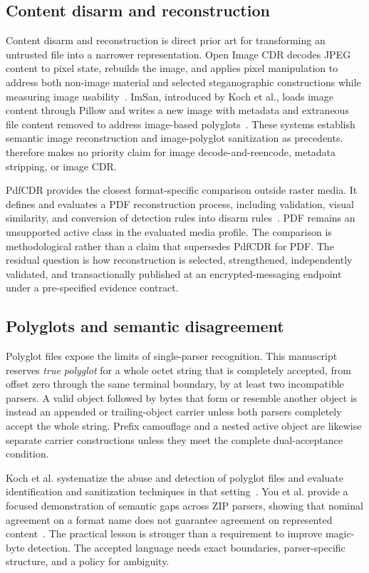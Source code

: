\subsection{Content disarm and reconstruction}

Content disarm and reconstruction is direct prior art for transforming an
untrusted file into a narrower representation. Open Image CDR decodes JPEG
content to pixel state, rebuilds the image, and applies pixel manipulation to
address both non-image material and selected steganographic constructions while
measuring image usability~\cite{belkind2023}. ImSan, introduced by Koch et al.,
loads image content through Pillow and writes a new image with metadata and
extraneous file content removed to address image-based polyglots~\cite{koch2025}.
These systems establish semantic image reconstruction and image-polyglot
sanitization as precedents. \AFD{} therefore makes no priority claim for image
decode-and-reencode, metadata stripping, or image CDR.

PdfCDR provides the closest format-specific comparison outside raster media. It
defines and evaluates a PDF reconstruction process, including validation,
visual similarity, and conversion of detection rules into disarm
rules~\cite{dubin2023}. PDF remains an unsupported active class in the evaluated
\AFD{} media profile. The comparison is methodological rather than a claim that
\AFD{} supersedes PdfCDR for PDF. The residual question is how reconstruction
is selected, strengthened, independently validated, and transactionally
published at an encrypted-messaging endpoint under a pre-specified evidence
contract.

\subsection{Polyglots and semantic disagreement}

Polyglot files expose the limits of single-parser recognition. This manuscript
reserves \emph{true polyglot} for a whole octet string that is completely
accepted, from offset zero through the same terminal boundary, by at least two
incompatible parsers. A valid object followed by bytes that form or resemble
another object is instead an appended or trailing-object carrier unless both
parsers completely accept the whole string. Prefix camouflage and a nested
active object are likewise separate carrier constructions unless they meet the
complete dual-acceptance condition.

Koch et al. systematize the abuse and detection of polyglot files and evaluate
identification and sanitization techniques in that setting~\cite{koch2025}.
You et al. provide a focused demonstration of semantic gaps across ZIP parsers,
showing that nominal agreement on a format name does not guarantee agreement on
represented content~\cite{you2025}. The practical lesson is stronger than a
requirement to improve magic-byte detection. The accepted language needs exact
boundaries, parser-specific structure, and a policy for ambiguity.

